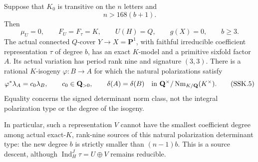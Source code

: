 \begin{theorem}[HD-SS06]
Suppose that \(K_0\) is transitive on the \(n\) letters and
\[
                              n>168(b+1).
 \tag{SSK.3}
\]
Then
\[
 \mu_U=0,\qquad F_U=F_\tau=K,\qquad
 U(H)=Q,\qquad g(X)=0,\qquad b\ge3.
 \tag{SSK.4}
\]
The actual connected \(Q\)-cover \(Y\longrightarrow X=\mathbf P^1\),
with faithful irreducible coefficient representation \(\tau\) of
degree \(b\), has an exact \(K\)-model and a primitive sixfold factor
\(A\). Its actual variation has period rank nine and signature
\((3,3)\). There is a rational \(K\)-isogeny \(\varphi:B\longrightarrow A\)
for which the natural polarizations satisfy
\[
 \varphi^*\lambda_A=c_0\lambda_B,\qquad c_0\in\mathbf Q_{>0},
 \qquad
 \delta(A)=\delta(B)
       \quad\hbox{in }\mathbf Q^\times/
                         \operatorname{Nm}_{K/\mathbf Q}(K^\times).
 \tag{SSK.5}
\]
Equality concerns the signed determinant norm class, not the integral
polarization type or the degree of the isogeny.

In particular, such a representation \(V\) cannot have the smallest
coefficient degree among actual exact-\(K\), rank-nine sources of
this natural polarization determinant type: the new degree \(b\)
is strictly smaller than \((n-1)b\). This is a source descent,
although \(\operatorname{Ind}_H^J\tau=U\oplus V\) remains reducible.
\end{theorem}

